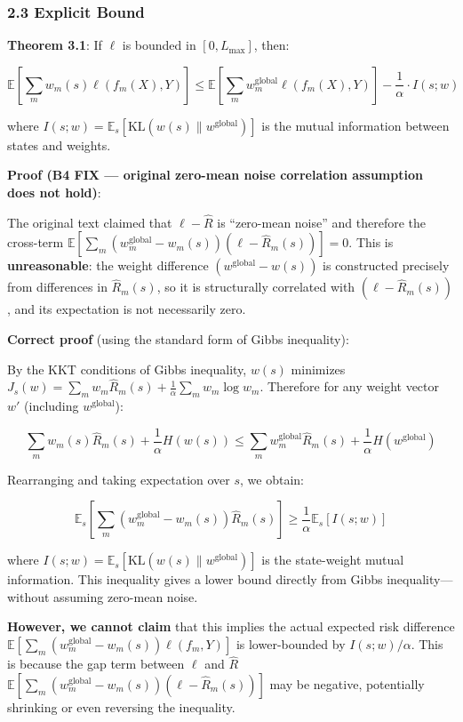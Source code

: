 \documentclass[
  12pt,
]{article}
\begin{document}
\subsubsection{2.3 Explicit Bound}\label{explicit-bound}

\textbf{Theorem 3.1}: If \(\ell\) is bounded in \([0, L_{\max}]\), then:

\[\mathbb{E}\left[\sum_m w_m(s) \ell(f_m(X), Y)\right] \leq \mathbb{E}\left[\sum_m w_m^{\text{global}} \ell(f_m(X), Y)\right] - \frac{1}{\alpha} \cdot I(s; w)\]

where \(I(s; w) = \mathbb{E}_s[\text{KL}(w(s) \| w^{\text{global}})]\)
is the mutual information between states and weights.

\textbf{Proof (B4 FIX --- original zero-mean noise correlation assumption does not hold)}:

The original text claimed that \(\ell - \hat{R}\) is ``zero-mean noise'' and therefore the cross-term
\(\mathbb{E}[\sum_m (w_m^{\text{global}} - w_m(s)) (\ell - \hat{R}_m(s))] = 0\). This is \textbf{unreasonable}: the weight difference
\((w^{\text{global}} - w(s))\) is constructed precisely from differences in \(\hat{R}_m(s)\),
so it is structurally correlated with \((\ell - \hat{R}_m(s))\),
and its expectation is not necessarily zero.

\textbf{Correct proof} (using the standard form of Gibbs inequality):

By the KKT conditions of Gibbs inequality, \(w(s)\) minimizes
\(J_s(w) = \sum_m w_m \hat{R}_m(s) + \frac{1}{\alpha} \sum_m w_m \log w_m\). Therefore for any weight vector
\(w'\) (including \(w^{\text{global}}\)):

\[\sum_m w_m(s) \hat{R}_m(s) + \frac{1}{\alpha} H(w(s)) \leq \sum_m w_m^{\text{global}} \hat{R}_m(s) + \frac{1}{\alpha} H(w^{\text{global}})\]

Rearranging and taking expectation over \(s\), we obtain:

\[\mathbb{E}_s\!\left[\sum_m (w_m^{\text{global}} - w_m(s)) \hat{R}_m(s)\right] \geq \frac{1}{\alpha} \mathbb{E}_s[I(s; w)]\]

where \(I(s; w) = \mathbb{E}_s[\text{KL}(w(s) \| w^{\text{global}})]\)
is the state-weight mutual information. This inequality gives a lower bound directly from Gibbs inequality---without assuming zero-mean noise.

\textbf{However, we cannot claim} that this implies the actual expected risk difference
\(\mathbb{E}[\sum_m (w_m^{\text{global}} - w_m(s)) \ell(f_m, Y)]\) is lower-bounded by
\(I(s;w)/\alpha\). This is because the gap term between \(\ell\) and \(\hat{R}\)
\(\mathbb{E}[\sum_m (w_m^{\text{global}} - w_m(s))(\ell - \hat{R}_m(s))]\)
may be negative, potentially shrinking or even reversing the inequality.
\end{document}
